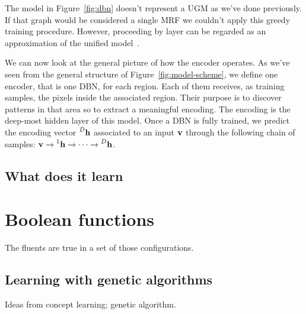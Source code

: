 The model in Figure~\ref{fig:dbn} doesn't represent a UGM as we've done
previously. If that graph would be considered a single MRF we couldn't apply
this greedy training procedure. However, proceeding by layer can be regarded
as an approximation of the unified model~\cite{bib:dbn-learning}.

We can now look at the general picture of how the encoder operates. As we've
seen from the general structure of Figure~\vref{fig:model-scheme}, we define
one encoder, that is one DBN, for each region. Each of them receives, as
training samples, the pixels inside the associated region. Their purpose is to
discover patterns in that area so to extract a meaningful encoding. The
encoding is the deep-most hidden layer of this model. Once a DBN is fully
trained, we predict the encoding vector $\prescript{D}{}{\mathbf{h}}$ associated
to an input $\mathbf{v}$ through the following chain of samples: $\mathbf{v} \to
\prescript{1}{}{\mathbf{h}} \to \dots \to \prescript{D}{}{\mathbf{h}}$.


\subsection{What does it learn}

\label{sec:encoding-what-learns}




\section{Boolean functions}

The fluents are true in a set of those configurations.

\subsection{Learning with genetic algorithms}

Ideas from concept learning; genetic algorithm.

